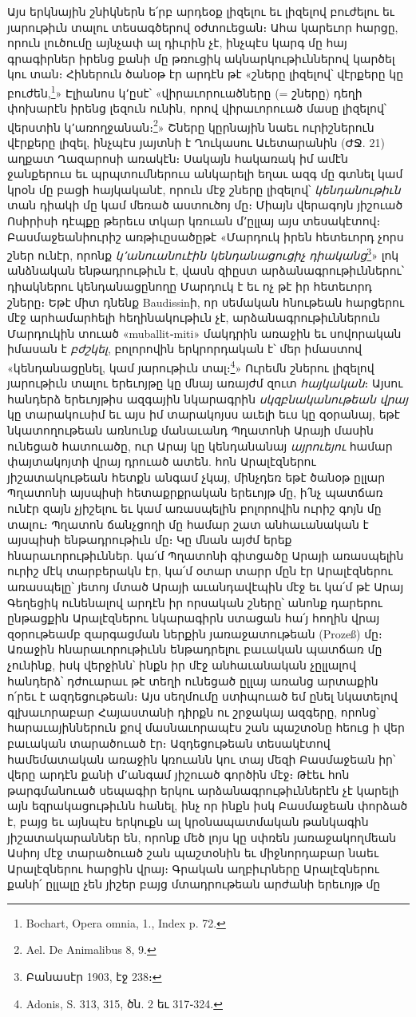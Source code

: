 \documentclass{article}
\begin{document}
{Այս երկնային շնիկներն ե՛րբ արդեօք լիզելու եւ լիզելով բուժելու եւ յարութիւն տալու տեսագծերով օժտուեցան։ Ահա կարեւոր հարցը, որուն լուծումը այնչափ ալ դիւրին չէ, ինչպէս կարգ մը հայ գրագիրներ իրենց քանի մը թռուցիկ ակնարկութիւններով կարծել կու տան։ Հիներուն ծանօթ էր արդէն թէ «շները լիզելով՝ վէրքերը կը բուժեն,\footnote{Bochart, Opera omnia, 1., Index p. 72.}» Էլիանոս կ՚ըսէ՝ «վիրաւորուածները (= շները) դեղի փոխարէն իրենց լեզուն ունին, որով վիրաւորուած մասը լիզելով՝ վերստին կ՚առողջանան։\footnote{Ael. De Animalibus 8, 9.}» Շները կըրնային նաեւ ուրիշներուն վէրքերը լիզել, ինչպէս յայտնի է Ղուկասու Աւետարանին (ԺՋ. 21) աղքատ Ղազարոսի առակէն։ Սակայն հակառակ իմ ամէն ջանքերուս եւ պրպտումներուս անկարելի եղաւ ազգ մը գտնել կամ կրօն մը բացի հայկականէ, որուն մէջ շները լիզելով՝ \emph{կենդանութիւն} տան դիակի մը կամ մեռած աստուծոյ մը։ Միայն վերագոյն յիշուած Ոսիրիսի դէպքը թերեւս տկար կռուան մ՚ըլլայ այս տեսակէտով։ Բասմաջեանիուրիշ առթիւըսածըթէ «Մարդուկ իրեն հետեւորդ չորս շներ ունէր, որոնք \emph{կ՚անուանուէին կենդանացուցիչ դիականց}\footnote{Բանասէր 1903, էջ 238։}» լոկ անձնական ենթադրութիւն է, վասն զիըստ արձանագրութիւններու՝ դիակներու կենդանացընողը Մարդուկ է եւ ոչ թէ իր հետեւորդ շները։ Եթէ միտ դնենք Baudissinի, որ սեմական հնութեան հարցերու մէջ արհամարհելի հեղինակութիւն չէ, արձանագրութիւններուն Մարդուկին տուած «muballit֊miti» մակդրին առաջին եւ սովորական իմասան է \emph{բժշկել}, բոլորովին երկրորդական է՝ մեր իմաստով «կենդանացընել, կամ յարութիւն տալ։\footnote{Adonis, S. 313, 315, ծն. 2 եւ 317֊324.}» Ուրեմն շներու լիզելով յարութիւն տալու երեւոյթը կը մնայ առայժմ զուտ \emph{հայկական}։ Այսու հանդերձ երեւոյթիս ազգային նկարագրին \emph{սկզբնականութեան վրայ} կը տարակուսիմ եւ այս իմ տարակոյսս աւելի եւս կը զօրանայ, եթէ նկատողութեան առնունք մանաւանդ Պղատոնի Արայի մասին ունեցած հատուածը, ուր Արայ կը կենդանանայ \emph{այրուեյու} համար փայտակոյտի վրայ դրուած ատեն. հոն Արալէզներու յիշատակութեան հետքն անգամ չկայ, մինչդեռ եթէ ծանօթ ըլլար Պղատոնի այսպիսի հետաքրքրական երեւոյթ մը, ի՛նչ պատճառ ունէր զայն չյիշելու եւ կամ առասպելին բոլորովին ուրիշ գոյն մը տալու։ Պղատոն ճանչցողի մը համար շատ անհաւանական է այսպիսի ենթադրութիւն մը։ Կը մնան այժմ երեք հնարաւորութիւններ. կա՛մ Պղատոնի գիտցածը Արայի առասպելին ուրիշ մէկ տարբերակն էր, կա՛մ օտար տարր մըն էր Արալէզներու առասպելը՝ յետոյ մտած Արայի աւանդավէպին մէջ եւ կա՛մ թէ Արայ Գեղեցիկ ունենալով արդէն իր որսական շները՝ անոնք դարերու ընթացքին Արալէզներու նկարագիրն ստացան հա՛յ հողին վրայ զօրութեամբ զարգացման ներքին յառաջատութեան (Prozeß) մը։ Առաջին հնարաւորութիւնն ենթադրելու բաւական պատճառ մը չունինք, իսկ վերջինն՝ ինքն իր մէջ անհաւանական չըլլալով հանդերձ՝ դժուարաւ թէ տեղի ունեցած ըլլայ առանց արտաքին ո՛րեւ է ազդեցութեան։ Այս սեղմումը ստիպուած եմ ընել նկատելով գլխաւորաբար Հայաստանի դիրքն ու շրջակայ ազգերը, որոնց՝ հարաւայիններուն քով մասնաւորապէս շան պաշտօնը հեուց ի վեր բաւական տարածուած էր։ Ազդեցութեան տեսակէտով համեմատական առաջին կռուանն կու տայ մեզի Բասմաջեան իր՝ վերը արդէն քանի մ՚անգամ յիշուած գործին մէջ։ Թէեւ հոն թարգմանուած սեպագիր երկու արձանագրութիւններէն չէ կարելի այն եզրակացութիւնն հանել, ինչ որ ինքն իսկ Բասմաջեան փորձած է, բայց եւ այնպէս երկուքն ալ կրօնապատմական թանկագին յիշատակարաններ են, որոնք մեծ լոյս կը սփռեն յառաջակողմեան Ասիոյ մէջ տարածուած շան պաշտօնին եւ միջնորդաբար նաեւ Արալէզներու հարցին վրայ։ Գրական աղբիւրները Արալէզներու քանի՛ ըլլալը չեն յիշեր բայց մտադրութեան արժանի երեւոյթ մը }
\end{document}
